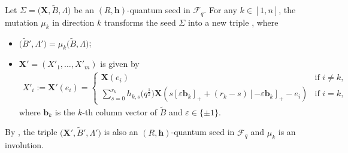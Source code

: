 \documentclass[11pt]{article}
\numberwithin{equation}{section}
\numberwithin{equation}{section}
\begin{document}
 \begin{Definition}\label{mutation_of_generalzied_seed}
Let $\Sigma=\bigl(\mathbf{X},\tilde{B},\Lambda\bigr)$ be an $(R,\mathbf{h})$-quantum seed in $\mathcal{F}_q$. For any $k\in[1,n]$, the mutation $\mu_k$ in direction $k$ transforms the seed $\Sigma$ into a new triple , where
\begin{itemize}\itemsep=0pt
\item[(1)] $\bigl(\tilde{B}', \Lambda'\bigr)=\mu_{k}\bigl(\tilde{B},\Lambda\bigr)$;
\item[(2)] $\mathbf{X}'=(X'_1,\dots, X'_m)$ is given by
\begin{align*}
 X'_i:=\mathbf{X}'(e_i)=\begin{cases}
 \mathbf{X}(e_i)&\text{if }i\neq k,\\
 \displaystyle\sum\limits_{s=0}^{r_k}h_{k,s}\bigl(q^{\frac{1}{2}}\bigr)\mathbf{X}(s[\varepsilon \mathbf{b}_k]_{+}+(r_{k}-s)[-\varepsilon \mathbf{b}_k]_+-e_i)&\text{if }i=k,
 \end{cases}
\end{align*}
where $\mathbf{b}_k$ is the $k$-th column vector of $\tilde{B}$ and $\varepsilon\in\{\pm 1\}$.
\end{itemize}
\end{Definition}
By \cite[Propositions 3.6 and 3.7]{BCDX2018}, the triple $\bigl(\mathbf{X}',\tilde{B}',\Lambda'\bigr)$ is also an $(R,\mathbf{h})$-quantum seed in $\mathcal{F}_q$ and $\mu_{k}$ is an involution.
\end{document}
